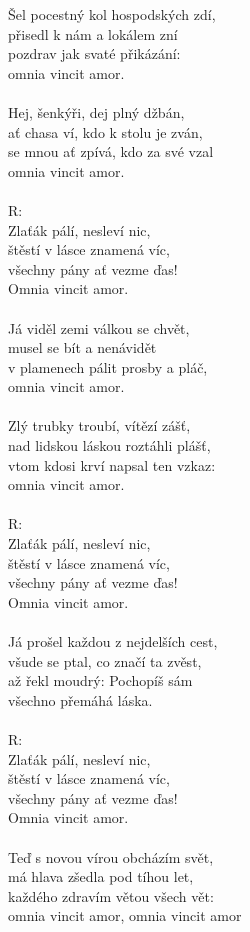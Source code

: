 \documentclass[a4paper,twocolumn,openany,nodeprecatedcode, justified]{dndbook}
\begin{document}
	\newpage
	\begin{DndReadAloud}
		\sffamily
		Šel pocestný kol hospodských zdí,\\
		přisedl k nám a lokálem zní\\
		pozdrav jak svaté přikázání:\\
		omnia vincit amor.\\
		\\
		Hej, šenkýři, dej plný džbán,\\
		ať chasa ví, kdo k stolu je zván,\\
		se mnou ať zpívá, kdo za své vzal\\
		omnia vincit amor.\\
		\\
		R:\\
		Zlaťák pálí, nesleví nic,\\
		štěstí v lásce znamená víc,\\
		všechny pány ať vezme ďas!\\
		Omnia vincit amor.\\
		\\
		Já viděl zemi válkou se chvět,\\
		musel se bít a nenávidět\\
		v plamenech pálit prosby a pláč,\\
		omnia vincit amor.\\
		\\
		Zlý trubky troubí, vítězí zášť,\\
		nad lidskou láskou roztáhli plášť,\\
		vtom kdosi krví napsal ten vzkaz:\\
		omnia vincit amor.\\
		\\
		R:\\
		Zlaťák pálí, nesleví nic,\\
		štěstí v lásce znamená víc,\\
		všechny pány ať vezme ďas!\\
		Omnia vincit amor.\\
		\\
		Já prošel každou z nejdelších cest,\\
		všude se ptal, co značí ta zvěst,\\
		až řekl moudrý: Pochopíš sám\\
		všechno přemáhá láska.\\
		\\
		R:\\
		Zlaťák pálí, nesleví nic,\\
		štěstí v lásce znamená víc,\\
		všechny pány ať vezme ďas!\\
		Omnia vincit amor.\\
		\\
		Teď s novou vírou obcházím svět,\\
		má hlava zšedla pod tíhou let,\\
		každého zdravím větou všech vět:\\
		omnia vincit amor, omnia vincit amor
	\end{DndReadAloud}
\end{document}
